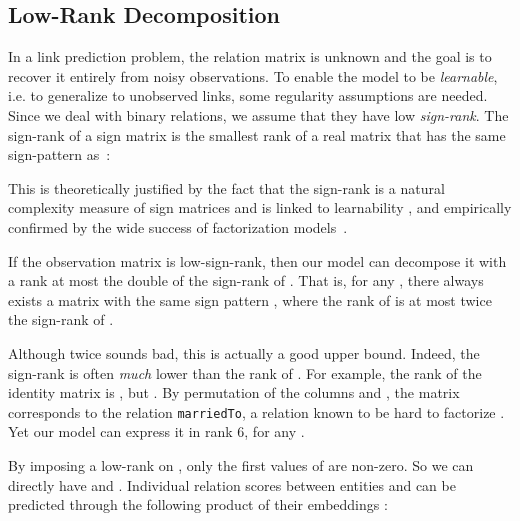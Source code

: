 \documentclass{article}
\begin{document}
\subsection{Low-Rank Decomposition}

In a link prediction problem, the relation matrix is unknown and the goal is to recover it entirely from noisy observations. To enable the model to be \emph{learnable}, i.e. to generalize to unobserved links, some regularity assumptions are needed. Since we deal with binary relations, we assume that they have low \emph{sign-rank}. The sign-rank of a sign matrix is the smallest rank of a real matrix that has the same sign-pattern as~:


This is theoretically justified by the fact that the sign-rank is a natural complexity measure of sign matrices \mbox{\cite{Linial2007}} and is linked to learnability \cite{alon2015sign}, and empirically confirmed by the wide success of factorization models~\cite{nickel_2016_review}. 


If the observation matrix  is low-sign-rank, then our
model can decompose it with a rank at most the double of
the sign-rank of .
That is, for any , there always exists a matrix  with the same sign pattern , where the rank of  is at most twice the sign-rank of  \cite{trouillon_unitdiag2016}.

Although twice sounds bad, this is actually a good upper bound. Indeed, the sign-rank is often \emph{much} lower than the rank
of . For example, the rank of the  identity matrix
 is , but  \cite{alon2015sign}. By permutation
of the columns  and , the  matrix corresponds to the
relation \texttt{marriedTo}, a relation known to be hard to
factorize \cite{Nickel2014}. Yet our model can express it in rank 6, for any .










By imposing a low-rank  on , only the first  values of
 are non-zero. So we can directly have  and
. Individual relation scores  between entities  and  can be predicted through the following product of their embeddings :
\end{document}
